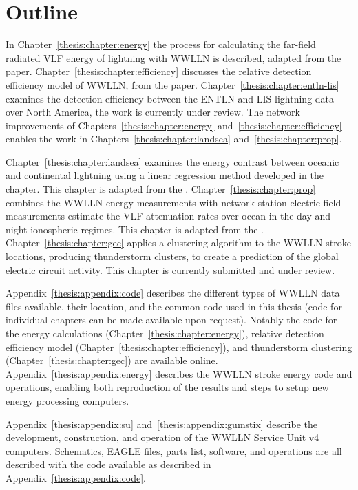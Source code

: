\section{Outline}

In Chapter~\ref{thesis:chapter:energy} the process for calculating the far-field radiated VLF energy of lightning with WWLLN is described, adapted from the \citet{Hutchins2012} paper.
Chapter~\ref{thesis:chapter:efficiency} discusses the relative detection efficiency model of WWLLN, from the \citet{Hutchins2012a} paper.
Chapter~\ref{thesis:chapter:entln-lis} examines the detection efficiency between the ENTLN and LIS lightning data over North America, the work is currently under review.
The network improvements of Chapters~\ref{thesis:chapter:energy} and~\ref{thesis:chapter:efficiency} enables the work in Chapters~\ref{thesis:chapter:landsea} and~\ref{thesis:chapter:prop}.

Chapter~\ref{thesis:chapter:landsea} examines the energy contrast between oceanic and continental lightning using a linear regression method developed in the chapter.
This chapter is adapted from the \citet{Hutchins2013}.
Chapter~\ref{thesis:chapter:prop} combines the WWLLN energy measurements with network station electric field measurements estimate the VLF attenuation rates over ocean in the day and night ionospheric regimes.
This chapter is adapted from the \citet{Hutchins2013a}.
Chapter~\ref{thesis:chapter:gec} applies a clustering algorithm to the WWLLN stroke locations, producing thunderstorm clusters, to create a prediction of the global electric circuit activity.
This chapter is currently submitted and under review.

Appendix~\ref{thesis:appendix:code} describes the different types of WWLLN data files available, their location, and the common code used in this thesis (code for individual chapters can be made available upon request).
Notably the code for the energy calculations (Chapter~\ref{thesis:chapter:energy}), relative detection efficiency model (Chapter~\ref{thesis:chapter:efficiency}), and thunderstorm clustering (Chapter~\ref{thesis:chapter:gec}) are available online.
Appendix~\ref{thesis:appendix:energy} describes the WWLLN stroke energy code and operations, enabling both reproduction of the results and steps to setup new energy processing computers.

Appendix~\ref{thesis:appendix:su} and~\ref{thesis:appendix:gumstix} describe the development, construction, and operation of the WWLLN Service Unit v4 computers.
Schematics, EAGLE files, parts list, software, and operations are all described with the code available as described in Appendix~\ref{thesis:appendix:code}.
